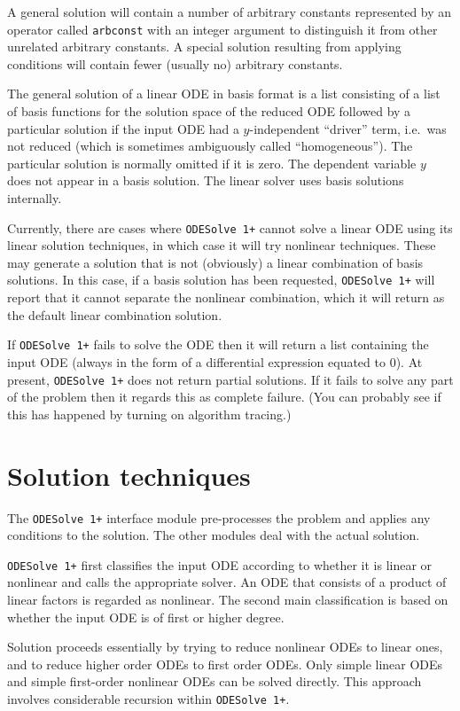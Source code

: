 \documentclass[a4paper]{article} %
\newcommand{\ODESolve}[1]{\texttt{ODESolve\,#1}}
\begin{document}
A general solution will contain a number of arbitrary constants
represented by an operator called \texttt{arbconst} with an integer
argument to distinguish it from other unrelated arbitrary constants.
A special solution resulting from applying conditions will contain
fewer (usually no) arbitrary constants.

The general solution of a linear ODE in basis format is a list
consisting of a list of basis functions for the solution space of the
reduced ODE followed by a particular solution if the input ODE had a
$y$-independent ``driver'' term, i.e.\ was not reduced (which is
sometimes ambiguously called ``homogeneous'').  The particular
solution is normally omitted if it is zero.  The dependent variable
$y$ does not appear in a basis solution.  The linear solver uses basis
solutions internally.

Currently, there are cases where \ODESolve{1+} cannot solve a linear ODE
using its linear solution techniques, in which case it will try
nonlinear techniques.  These may generate a solution that is not
(obviously) a linear combination of basis solutions.  In this case, if
a basis solution has been requested, \ODESolve{1+} will report that it
cannot separate the nonlinear combination, which it will return as the
default linear combination solution.

If \ODESolve{1+} fails to solve the ODE then it will return a list
containing the input ODE (always in the form of a differential
expression equated to 0).  At present, \ODESolve{1+} does not return
partial solutions.  If it fails to solve any part of the problem then
it regards this as complete failure.  (You can probably see if this
has happened by turning on algorithm tracing.)


\section{Solution techniques}

The \ODESolve{1+} interface module pre-processes the problem and applies
any conditions to the solution.  The other modules deal with the
actual solution.

\ODESolve{1+} first classifies the input ODE according to whether it
is linear or nonlinear and calls the appropriate solver.  An ODE that
consists of a product of linear factors is regarded as nonlinear.  The
second main classification is based on whether the input ODE is of
first or higher degree.

Solution proceeds essentially by trying to reduce nonlinear ODEs to
linear ones, and to reduce higher order ODEs to first order ODEs.
Only simple linear ODEs and simple first-order nonlinear ODEs can be
solved directly.  This approach involves considerable recursion within
\ODESolve{1+}.
\end{document}
